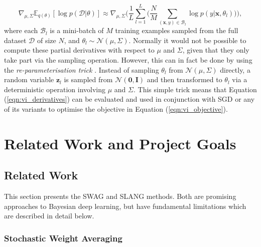 \documentclass[msc,deptreport.inf]{infthesis} %
\newcommand{\matr}[1]{\mathbf{#1}}
\newcommand{\E}{\mathbb E}
\begin{document}
\begin{equation}\label{eqn:vi_derivatives}
	 \nabla_{\mu, \Sigma} \E_{q(\theta)} [\log p(\mathcal{D} | \theta)]
	\approx \nabla_{\mu, \Sigma} \Bigg(\frac{1}{L}  \sum_{l=1}^{L} \Bigg( \frac{N}{M} \sum_{(\matr{x}, y) \in \mathcal{B}_l} \log p(y | \matr{x}, \theta_l) \Bigg)\Bigg),
\end{equation}
where each $\mathcal{B}_l$ is a mini-batch of $M$ training examples sampled from the full dataset $\mathcal{D}$ of size $N$, and $\theta_l \sim \mathcal{N}(\mu, \Sigma)$. Normally it would not be possible to compute these partial derivatives with respect to $\mu$ and $\Sigma$, given that they only take part via the sampling operation. However, this can in fact be done by using the \emph{re-parameterisation trick} \cite{goodfellow2016}. Instead of sampling $\theta_l$ from $\mathcal{N}(\mu, \Sigma)$ directly, a random variable $\matr{z}_l$ is sampled from $\mathcal{N}(\matr{0}, \matr{I})$ and then transformed to $\theta_l$ via a deterministic operation involving $\mu$ and $\Sigma$. This simple trick means that Equation (\ref{eqn:vi_derivatives}) can be evaluated and used in conjunction with SGD or any of its variants to optimise the objective in Equation (\ref{eqn:vi_objective}).


\chapter{Related Work and Project Goals}\label{ch:previous_work}

\section{Related Work}\label{sec:related_work}

This section presents the SWAG and SLANG methods. Both are promising approaches to Bayesian deep learning, but have fundamental limitations which are described in detail below.

\subsection{Stochastic Weight Averaging}\label{sec:swa}
\end{document}
